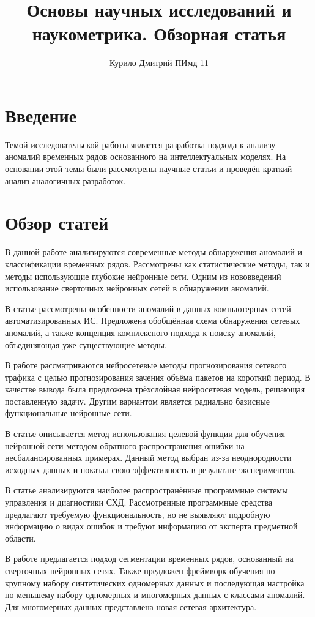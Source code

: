 \documentclass[12pt,a4paper]{article}
\title{Основы научных исследований и наукометрика. Обзорная статья}
\author{Курило Дмитрий ПИмд-11}
\date{}
\begin{document}
\maketitle

\section*{Введение}
Темой исследовательской работы является разработка подхода к анализу аномалий временных рядов основанного на интеллектуальных моделях. На основании этой темы были рассмотрены научные статьи и проведён краткий анализ аналогичных разработок. 
\section*{Обзор статей}
В данной \cite{art1} работе анализируются современные методы обнаружения аномалий и классификации временных рядов. Рассмотрены как статистические методы, так и методы использующие глубокие нейронные сети. Одним из нововведений использование сверточных нейронных сетей в обнаружении аномалий.

В статье \cite{art2} рассмотрены особенности аномалий в данных компьютерных сетей автоматизированных ИС. Предложена обобщённая схема обнаружения сетевых аномалий, а также концепция комплексного подхода к поиску аномалий, объединяющая уже существующие методы.

В работе \cite{art3} рассматриваются нейросетевые методы прогнозирования сетевого трафика с целью прогнозирования зачения объёма пакетов на короткий период. В качестве вывода была предложена трёхслойная нейросетевая модель, решающая поставленную задачу. Другим вариантом является радиально базисные функциональные нейронные сети.

В статье \cite{art4} описывается метод использования целевой функции для обучения нейронной сети методом обратного распространения ошибки на несбалансированных примерах. Данный метод выбран из-за неоднородности исходных данных и показал свою эффективность в результате экспериментов. 

В статье \cite{art5} анализируются наиболее распространённые программные системы управления и диагностики СХД. Рассмотренные программные средства предлагают требуемую функциональность, но не выявляют подробную информацию о видах ошибок и требуют информацию от эксперта предметной области.

В работе \cite{art6} предлагается подход сегментации временных рядов, основанный на сверточных нейронных сетях. Также предложен фреймворк обучения по крупному набору синтетических одномерных данных и последующая настройка по меньшему набору одномерных и многомерных данных с классами аномалий. Для многомерных данных представлена новая сетевая архитектура.
\end{document}
